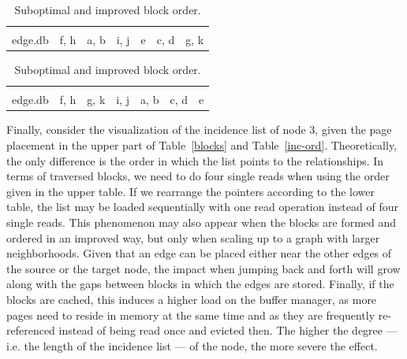      \begin{table}[htp]
          \centering
    \begin{tabular}{|l | c | c | c | c | c | c|} \hline
    &&&&&&\\[-1em]
     edge.db &  \colorbox{green!30}{f}, \colorbox{green!30}{h}   & \colorbox{blue!30}{a}, \colorbox{blue!30}{b} & \colorbox{green!30}{i}, \colorbox{green!30}{j} & \colorbox{red!30}{e} & \colorbox{blue!30}{c}, \colorbox{blue!30}{d} & \colorbox{green!30}{g}, \colorbox{green!30}{k} \\ \hline
    \end{tabular}
    \vspace{0.5cm}
    
    \begin{tabular}{|l | c | c | c | c | c | c|}\hline
    &&&&&&\\[-1em]
     edge.db &  \colorbox{green!30}{f}, \colorbox{green!30}{h} & \colorbox{green!30}{g}, \colorbox{green!30}{k} & \colorbox{green!30}{i}, \colorbox{green!30}{j} & \colorbox{blue!30}{a}, \colorbox{blue!30}{b} & \colorbox{blue!30}{c}, \colorbox{blue!30}{d} & \colorbox{red!30}{e} \\ \hline
    \end{tabular}
      \caption{Suboptimal and improved block order.}
    \label{order}
       \end{table}
  
  Finally, consider the visualization of the incidence list of node 3, given the page placement in the upper part of Table~\ref{blocks} and Table~\ref{inc-ord}. 
  Theoretically, the only difference is the order in which the list points to the relationships. 
  In terms of traversed blocks, we need to do four single reads when using the order given in the upper table. 
  If we rearrange the pointers according to the lower table, the list may be loaded sequentially with one read operation instead of four single reads. 
  This phenomenon may also appear when the blocks are formed and ordered in an improved way, but only when scaling up to a graph with larger neighborhoods.
  Given that an edge can be placed either near the other edges of the source or the target node, the impact when jumping back and forth will grow along with the gaps between blocks in which the edges are stored.
  Finally, if the blocks are cached, this induces a higher load on the buffer manager, as more pages need to reside in memory at the same time and as they are frequently re-referenced instead of being read once and evicted then.
  The higher the degree --- i.e. the length of the incidence list --- of the node, the more severe the effect.

